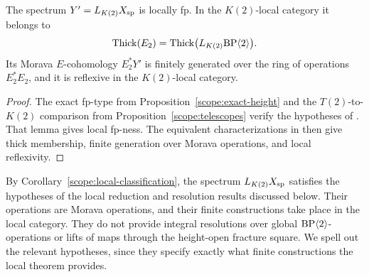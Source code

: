 \begin{corollary}
\label{scope:local-classification}
The spectrum \(Y'=L_{K(2)}X_{\rm sp}\) is locally fp.  In the
\(K(2)\)-local category it belongs to
\[
 \operatorname{Thick}(E_2)
   =\operatorname{Thick}\bigl(L_{K(2)}\mathrm{BP}\langle2\rangle\bigr).
\]
Its Morava \(E\)-cohomology \(E_2^*Y'\) is finitely generated over
the ring of operations \(E_2^*E_2\), and it is reflexive in the
\(K(2)\)-local category.
\end{corollary}

\begin{proof}
The exact fp-type from Proposition~\ref{scope:exact-height} and the
\(T(2)\)-to-\(K(2)\) comparison from
Proposition~\ref{scope:telescopes} verify the hypotheses of
\cite[Lemma~4.1]{LP2026}.  That lemma gives local fp-ness.  The
equivalent characterizations in \cite[Theorems~1.7, 1.8, and~4.3]{LP2026}
then give thick membership, finite generation over Morava operations,
and local reflexivity.
\end{proof}

By Corollary~\ref{scope:local-classification}, the spectrum
\(L_{K(2)}X_{\rm sp}\) satisfies the hypotheses of the local reduction
and resolution results discussed below.  Their operations are Morava
operations, and their finite constructions take place in the local
category.  They do not provide integral resolutions over global
\(\mathrm{BP}\langle2\rangle\)-operations or lifts of maps through the
height-open fracture square.  We spell out the relevant hypotheses,
since they specify exactly what finite constructions the local theorem
provides.

